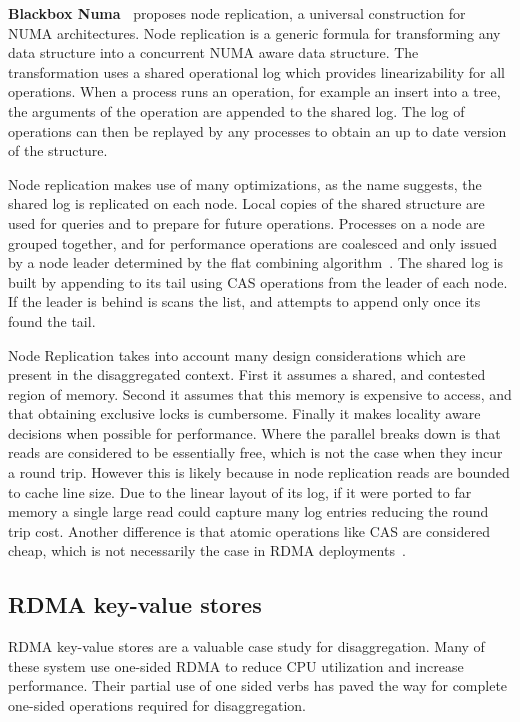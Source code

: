\textbf{Blackbox Numa~\cite{black-box-numa}} proposes node replication, a
universal construction for NUMA architectures. Node replication is a generic
formula for transforming any data structure into a concurrent NUMA aware data
structure. The transformation uses a shared operational log which provides
linearizability for all operations. When a process runs an operation, for
example an insert into a tree, the arguments of the operation are appended to
the shared log. The log of operations can then be replayed by any processes to
obtain an up to date version of the structure.

Node replication makes use of many optimizations, as the name suggests, the
shared log is replicated on each node. Local copies of the shared structure are
used for queries and to prepare for future operations. Processes on a node are
grouped together, and for performance operations are coalesced and only issued
by a node leader determined by the flat combining algorithm~\cite{flat-combine}.
The shared log is built by appending to its tail using CAS operations from the
leader of each node. If the leader is behind is scans the list, and attempts to
append only once its found the tail.

Node Replication takes into account many design considerations which are present
in the disaggregated context. First it assumes a shared, and contested region of
memory. Second it assumes that this memory is expensive to access, and that
obtaining exclusive locks is cumbersome. Finally it makes locality aware
decisions when possible for performance. Where the parallel breaks down is that
reads are considered to be essentially free, which is not the case when they
incur a round trip. However this is likely because in node replication reads are
bounded to cache line size. Due to the linear layout of its log, if it were
ported to far memory a single large read could capture many log entries reducing
the round trip cost. Another difference is that atomic operations like CAS are
considered cheap, which is not necessarily the case in RDMA
deployments~\cite{design-guidelines}.


\subsection{RDMA key-value stores}

RDMA key-value stores are a valuable case study for disaggregation. Many of
these system use one-sided RDMA to reduce CPU utilization and increase
performance. Their partial use of one sided verbs has paved the way for complete
one-sided operations required for disaggregation.


